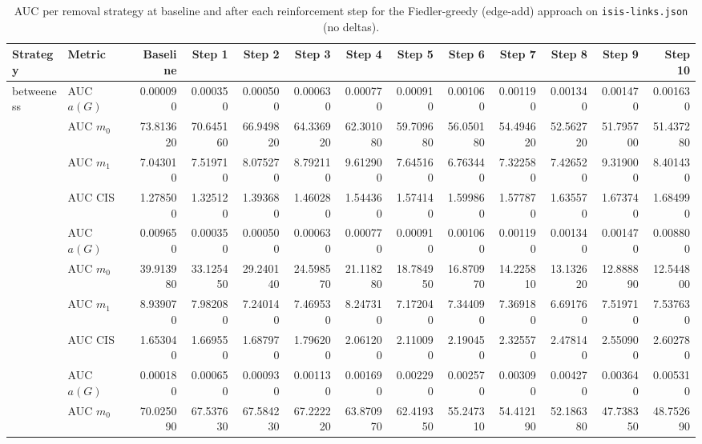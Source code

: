 \begin{table}[htbp]
  \centering
  \caption{AUC per removal strategy at baseline and after each reinforcement step for the Fiedler-greedy (edge-add) approach on \texttt{isis-links.json} (no deltas).}
  \label{tab:isis-links-fiedler_greedy-auc}
\setlength{\tabcolsep}{2.5pt}
  \begin{tabular}{llrrrrrrrrrrr}
    \toprule
    \textbf{Strategy} & \textbf{Metric} & \textbf{Baseline} & \textbf{Step 1} & \textbf{Step 2} & \textbf{Step 3} & \textbf{Step 4} & \textbf{Step 5} & \textbf{Step 6} & \textbf{Step 7} & \textbf{Step 8} & \textbf{Step 9} & \textbf{Step 10} \\
    \midrule
    \multirow{4}{*}{betweeness} & AUC $a(G)$ & 0.000090 & 0.000350 & 0.000500 & 0.000630 & 0.000770 & 0.000910 & 0.001060 & 0.001190 & 0.001340 & 0.001470 & 0.001630 \\
    & AUC $m_0$ & 73.813620 & 70.645160 & 66.949820 & 64.336920 & 62.301080 & 59.709680 & 56.050180 & 54.494620 & 52.562720 & 51.795700 & 51.437280 \\
    & AUC $m_1$ & 7.043010 & 7.519710 & 8.075270 & 8.792110 & 9.612900 & 7.645160 & 6.763440 & 7.322580 & 7.426520 & 9.319000 & 8.401430 \\
    & AUC CIS & 1.278500 & 1.325120 & 1.393680 & 1.460280 & 1.544360 & 1.574140 & 1.599860 & 1.577870 & 1.635570 & 1.673740 & 1.684990 \\
    \addlinespace
    \multirow{4}{*}{closeness} & AUC $a(G)$ & 0.009650 & 0.000350 & 0.000500 & 0.000630 & 0.000770 & 0.000910 & 0.001060 & 0.001190 & 0.001340 & 0.001470 & 0.008800 \\
    & AUC $m_0$ & 39.913980 & 33.125450 & 29.240140 & 24.598570 & 21.118280 & 18.784950 & 16.870970 & 14.225810 & 13.132620 & 12.888890 & 12.544800 \\
    & AUC $m_1$ & 8.939070 & 7.982080 & 7.240140 & 7.469530 & 8.247310 & 7.172040 & 7.344090 & 7.369180 & 6.691760 & 7.519710 & 7.537630 \\
    & AUC CIS & 1.653040 & 1.669550 & 1.687970 & 1.796200 & 2.061200 & 2.110090 & 2.190450 & 2.325570 & 2.478140 & 2.550900 & 2.602780 \\
    \addlinespace
    \multirow{4}{*}{core influence} & AUC $a(G)$ & 0.000180 & 0.000650 & 0.000930 & 0.001130 & 0.001690 & 0.002290 & 0.002570 & 0.003090 & 0.004270 & 0.003640 & 0.005310 \\
    & AUC $m_0$ & 70.025090 & 67.537630 & 67.584230 & 67.222220 & 63.870970 & 62.419350 & 55.247310 & 54.412190 & 52.186380 & 47.738350 & 48.752690 \\

\end{tabular}
\end{table}
